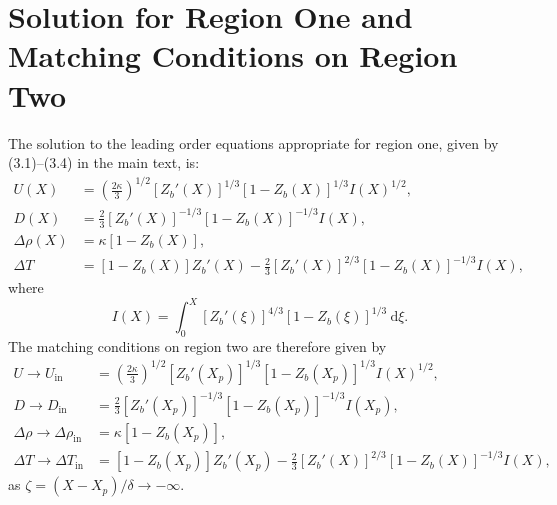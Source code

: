 \documentclass{article}
\begin{document}
\section{Solution for Region One and Matching Conditions on Region Two}
The solution to the leading order equations appropriate for region one, given by (3.1)--(3.4) in the main text, is:
\begin{align}
U(X) &=\left(\frac{2\kappa}{3}\right)^{1/2}\left[Z_b'(X)\right]^{1/3}\left[1 - Z_b(X)\right]^{1/3}I(X)^{1/2},\\
D(X) &= \frac{2}{3}\left[Z_b'(X)\right]^{-1/3}\left[1 - Z_b(X)\right]^{-1/3}I(X),\label{E:Region1:thickness_solution}\\
\Delta \rho(X) &= \kappa \left[ 1- Z_b(X)\right],\label{E:Region1:buoyancy_solution}\\
\Delta T &= \left[1-Z_b(X)\right]Z_b'(X) - \frac{2}{3}\left[Z_b'(X)\right]^{2/3} \left[1-Z_b(X)\right]^{-1/3}I(X),\label{E:Region1:thermal_solution}
\end{align}
where
\begin{equation}
I(X) =  \int_0^X \left[Z_b'(\xi)\right]^{4/3}\left[1 - Z_b(\xi)\right]^{1/3}~\mathrm{d}\xi.
\end{equation}
The matching conditions on region two are therefore given by
\begin{align}
U \to U_\text{in} &=\left(\frac{2\kappa}{3}\right)^{1/2}\left[Z_b'(X_p)\right]^{1/3}\left[1 - Z_b(X_p)\right]^{1/3}I(X)^{1/2},\\
D \to D_\text{in} &= \frac{2}{3}\left[Z_b'(X_p)\right]^{-1/3}\left[1 - Z_b(X_p)\right]^{-1/3}I(X_p),\label{E:Region1:thickness_solution}\\
\Delta \rho \to \Delta \rho_\text{in} &= \kappa \left[ 1- Z_b(X_p)\right],\label{E:Region1:buoyancy_solution}\\
\Delta T \to \Delta T_{\text{in}} &= \left[1-Z_b(X_p)\right]Z_b'(X_p) - \frac{2}{3}\left[Z_b'(X)\right]^{2/3} \left[1-Z_b(X)\right]^{-1/3}I(X),
\end{align}
as $\zeta = (X - X_p)/\delta \to -\infty$.
\end{document}
